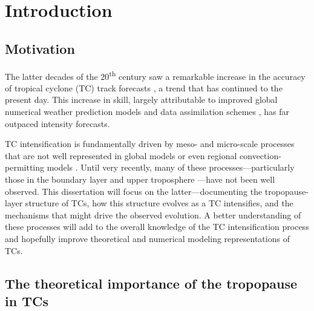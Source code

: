 \chapter{Introduction}
\label{intro}

\section{Motivation}

\indent \indent The latter decades of the 20\textsuperscript{th} century saw a remarkable increase in the accuracy of tropical cyclone (TC) track forecasts \citep{PowellAberson2001}, a trend that has continued to the present day.
This increase in skill, largely attributable to improved global numerical weather prediction models and data assimilation schemes \citep{Galletal2013}, has far outpaced intensity forecasts.

TC intensification is fundamentally driven by meso- and micro-scale processes that are not well represented in global models or even regional convection-permitting models \citep{Rogersetal2006}.
Until very recently, many of these processes---particularly those in the boundary layer \citep{Blacketal2007} and upper troposphere \citep{DoyleTCI}---have not been well observed.
This dissertation will focus on the latter---documenting the tropopause-layer structure of TCs, how this structure evolves as a TC intensifies, and the mechanisms that might drive the observed evolution.
A better understanding of these processes will add to the overall knowledge of the TC intensification process and hopefully improve theoretical and numerical modeling representations of TCs.

\section{The theoretical importance of the tropopause in TCs}
 
